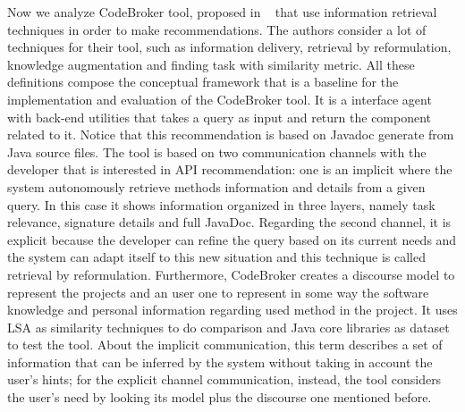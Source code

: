 Now we analyze CodeBroker tool, proposed in ~\cite{ye_reuse-conducive_2005} that use information retrieval techniques in order to make recommendations. The authors consider a lot of techniques for their tool, such as information delivery, retrieval by reformulation, knowledge augmentation and finding task with similarity metric. All these definitions compose the conceptual framework that is a baseline for the implementation and evaluation of the CodeBroker tool. It is a interface agent with back-end utilities that takes a query as input and return the component related to it. Notice that this recommendation is based on Javadoc generate from Java source files. The tool is based on two communication channels with the developer that is interested in API recommendation: one is an implicit where the system autonomously retrieve methods information and details from a given query. In this case it shows information organized in three layers, namely task relevance, signature details and full JavaDoc. Regarding the second channel, it is explicit because the developer can refine the query based on its current needs and the system can adapt itself to this new situation and this technique is called retrieval by reformulation. Furthermore, CodeBroker creates a discourse model to represent the projects and an user one to represent in some way the software knowledge and personal information regarding used method in the project. It uses LSA as similarity techniques to do comparison and Java core libraries as dataset to test the tool. About the implicit communication, this term describes a set of information that can be inferred by the system without taking in account the user's hints; for the explicit channel communication, instead, the tool considers the user's need by looking its model plus the discourse one mentioned before.\newline
